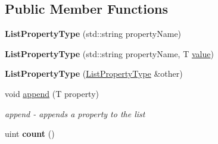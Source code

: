 \subsection*{Public Member Functions}
\begin{DoxyCompactItemize}
\item 
\hypertarget{classListPropertyType_a5e6f35179b6e7c79cf7dd831db1f5ffd}{{\bfseries List\+Property\+Type} (std\+::string property\+Name)}\label{classListPropertyType_a5e6f35179b6e7c79cf7dd831db1f5ffd}

\item 
\hypertarget{classListPropertyType_acfe0a06a5f388da8eb8e6e6578096dea}{{\bfseries List\+Property\+Type} (std\+::string property\+Name, T \hyperlink{classAbstractPropertyType_ae723621925382263eba046fa1ca8e36d}{value})}\label{classListPropertyType_acfe0a06a5f388da8eb8e6e6578096dea}

\item 
\hypertarget{classListPropertyType_a97b74dbcac25f0ea6610bfea24916ef6}{{\bfseries List\+Property\+Type} (\hyperlink{classListPropertyType}{List\+Property\+Type} \&other)}\label{classListPropertyType_a97b74dbcac25f0ea6610bfea24916ef6}

\item 
void \hyperlink{classListPropertyType_a08221e5a0b5f2ba3775e5537415481bb}{append} (T property)
\begin{DoxyCompactList}\small\item\em append -\/ appends a property to the list \end{DoxyCompactList}\item 
\hypertarget{classListPropertyType_a03589ed61592cf3061542b73abf00c67}{uint {\bfseries count} ()}\label{classListPropertyType_a03589ed61592cf3061542b73abf00c67}


\end{DoxyCompactItemize}
